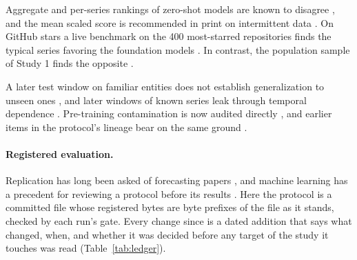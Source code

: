Aggregate and per-series rankings of zero-shot models are known to disagree \citep{islam2026, kim2026,
brini2026, cherif2026}, and the mean scaled score is recommended in print on intermittent data
\citep{corani2026}. On GitHub stars a live benchmark on the 400 most-starred repositories finds the typical
series favoring the foundation models \citep{garza2026}. In contrast, the population sample of Study 1 finds
the opposite \citep{wen2026}.

A later test window on familiar entities does not establish generalization to unseen ones
\citep{moghadasi2026}, and later windows of known series leak through temporal dependence \citep{qiao2026}.
Pre-training contamination is now audited directly \citep{li2026}, and earlier items in the protocol's lineage
bear on the same ground \citep{tsantilis2025, zodiac2026, meyer2025}.

\paragraph{Registered evaluation.} Replication has long been asked of forecasting papers \citep{hyndman2010},
and machine learning has a precedent for reviewing a protocol before its results \citep{preregister2021}. Here
the protocol is a committed file whose registered bytes are byte prefixes of the file as it stands, checked by
each run's gate. Every change since is a dated addition that says what changed, when, and whether it was
decided before any target of the study it touches was read (Table~\ref{tab:ledger}).
